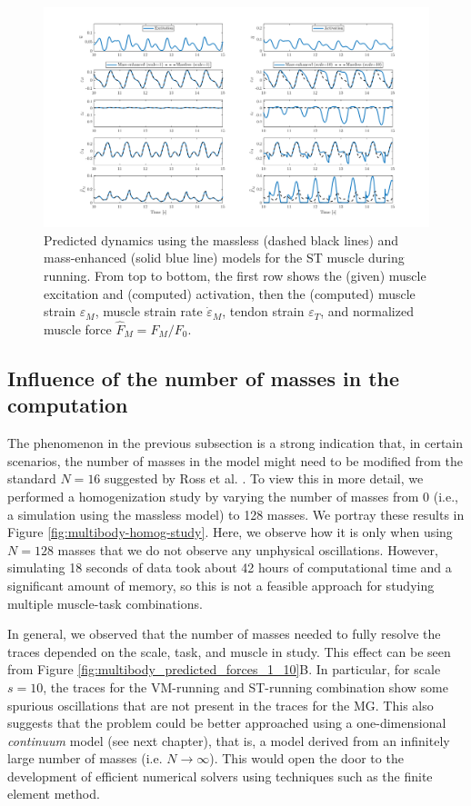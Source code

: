 \documentclass{sfuthesis}
\numberwithin{equation}{section}
\numberwithin{figure}{chapter}
\numberwithin{table}{chapter}
\theoremstyle{definition}
\newcommand{\depsilon}{\dot{\varepsilon}}
\begin{document}
\begin{figure} 
    \centering
    \hspace*{-5.5em}\includegraphics[width=1.25\textwidth]{st-running-strains-strain-rates-forces.png}
    \caption{Predicted dynamics using the massless (dashed black lines) and mass-enhanced (solid blue line) models for the ST muscle during running. From top to bottom, the first row shows the (given) muscle excitation and (computed) activation, then the (computed) muscle strain $\varepsilon_M$, muscle strain rate $\depsilon_M$, tendon strain $\varepsilon_T$, and normalized muscle force $\widehat{F}_M = F_M/F_0$.}
    \label{fig:multibody_traces_ST_running}
\end{figure}

\subsection{Influence of the number of masses in the computation}

The phenomenon in the previous subsection is a strong indication that, in certain scenarios, the number of masses in the model might need to be modified from the standard $N=16$ suggested by Ross et al. \cite{Ross2018-1D}. To view this in more detail, we performed a homogenization study by varying the number of masses from 0 (i.e., a simulation using the massless model) to 128 masses. We portray these results in Figure \ref{fig:multibody-homog-study}. Here, we observe how it is only when using $N=128$ masses that we do not observe any unphysical oscillations. However, simulating 18 seconds of data took about 42 hours of computational time and a significant amount of memory, so this is not a feasible approach for studying multiple muscle-task combinations. 

{\color{blue}In general, we observed that the number of masses needed to fully resolve the traces depended on the scale, task, and muscle in study. This effect can be seen from Figure \ref{fig:multibody_predicted_forces_1_10}B. In particular, for scale $s=10$, the traces for the VM-running and ST-running combination show some spurious oscillations that are not present in the traces for the MG. This also suggests that the problem could be better approached using a one-dimensional \textit{continuum} model (see next chapter), that is, a model derived from an infinitely large number of masses (i.e. $N \to \infty$). This would open the door to the development of efficient numerical solvers using techniques such as the finite element method.}
\end{document}
